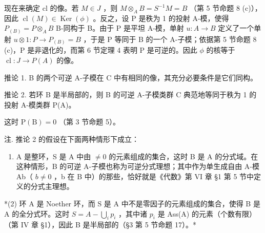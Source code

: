 现在来确定 cl 的像。若 \(M \in J\) ，则 \(M \otimes_{A} B = S^{-1}M = B\) （第 5 节命题 8 (c)），因此 \(\operatorname{cl}(M) \in \operatorname{Ker}(\phi)\) 。反之，设 P 是秩为 1 的投射 A-模，使得 \(P_{(B)} = P \otimes_{A} B\) B-同构于 B。由于 P 是平坦 A-模，单射 \(u: A \to B\) 定义了一个单射 \(u \otimes 1: P \to P_{(B)} = B\) ，于是 P 等同于 B 的一个 A-子模；依据第 5 节命题 8 (c)，P 是非退化的，而第 6 节定理 4 表明 P 是可逆的。因此 \(\phi\) 的核等于 \(\operatorname{cl}: J \to P(A)\) 的像。

推论 1. B 的两个可逆 A-子模在 C 中有相同的像，其充分必要条件是它们同构。

推论 2. 若环 B 是半局部的，则 B 的可逆 A-子模类群 C 典范地等同于秩为 1 的投射 A-模类群 P(A)。

这时 \(\mathrm{P(B)} = 0\) （第 3 节命题 5）。

注. 推论 2 的假设在下面两种情形下成立：

\begin{enumerate}
\def\labelenumi{(\arabic{enumi})}
\tightlist
\item
  A 是整环，S 是 A 中由 \(\neq0\) 的元素组成的集合，这时 B 是 A 的分式域。在这种情形，B 的可逆 A-子模也称为可逆分式理想；其中作为单生成自由 A-模 Ab（ \(b\neq0\) ，b 在 B 中）的那些，恰好就是《代数》第 VI 章 §1 第 5 节中定义的分式主理想。
\end{enumerate}

*(2) 环 A 是 Noether 环，而 S 是 A 中不是零因子的元素组成的集合，使得 B 是 A 的全分式环。这时 \(S = A - \bigcup_{i} p_i\) ，其中诸 \(p_i\) 是 Ass(A) 的元素（个数有限）（第 IV 章 §1），因此 B 是半局部的（§3 第 5 节命题 17）。*


